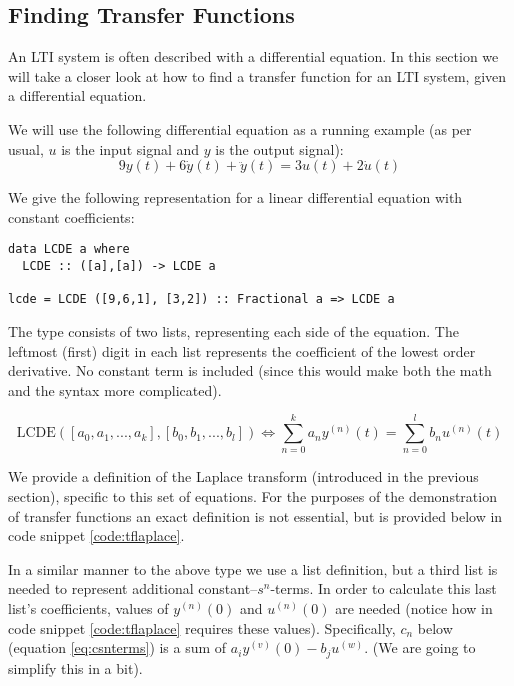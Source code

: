 \subsection{Finding Transfer Functions}
An LTI system is often described with a differential equation. In this section we will take a closer look at how to find a transfer function for an LTI system, given a differential equation.

We will use the following differential equation as a running example (as per usual, $u$ is the input signal and $y$ is the output signal):
\begin{equation*} %
9y(t)+6\dot{y}(t)+\ddot{y}(t)=3u(t)+2\dot{u}(t)
\end{equation*}

We give the following representation for a linear differential equation with
constant coefficients:

\begin{verbatim}
data LCDE a where
  LCDE :: ([a],[a]) -> LCDE a

lcde = LCDE ([9,6,1], [3,2]) :: Fractional a => LCDE a
\end{verbatim} 
The type consists of two lists, representing each side of the equation. The
leftmost (first) digit in each list represents the coefficient of the lowest order derivative. 
No constant term is included (since this would make both the math and the
syntax more complicated).

\begin{equation*}
\text{LCDE}([a_0,a_1,...,a_k],[b_0,b_1,...,b_l]) \iff \sum\limits^{k}_{n=0}{a_n y^{(n)}(t)} = \sum\limits^{l}_{n=0}{b_n u^{(n)}(t)}
\end{equation*}

We provide a definition of the Laplace transform (introduced in the previous section), specific to this set of equations. For the purposes of the demonstration of transfer functions an exact definition is not essential, but is provided below in code snippet \ref{code:tflaplace}.

In a similar manner to the above type we use a list definition, but a third
list is needed to represent additional constant--$s^n$-terms. %
In order to calculate this last list's coefficients, values of $y^{(n)}(0)$ and $u^{(n)}(0)$ are needed (notice how  in code snippet \ref{code:tflaplace} requires these values). Specifically, $c_n$ below (equation \ref{eq:csnterms}) is a sum of $a_i y^{(v)}(0) - b_j u^{(w)}$.
(We are going to simplify this in a bit).

